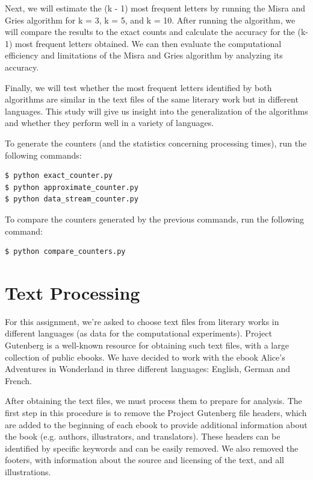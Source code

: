 \documentclass[]{revdetua}
\begin{document}
Next, we will estimate the (k - 1) most frequent letters by running the Misra and Gries algorithm for k = 3, k = 5, and k = 10. After running the algorithm, we will compare the results to the exact counts and calculate the accuracy for the (k-1) most frequent letters obtained. We can then evaluate the computational efficiency and limitations of the Misra and Gries algorithm by analyzing its accuracy.

Finally, we will test whether the most frequent letters identified by both algorithms are similar in the text files of the same literary work but in different languages. This study will give us insight into the generalization of the algorithms and whether they perform well in a variety of languages.

To generate the counters (and the statistics concerning processing times), run the following commands:

\begin{verbatim}
$ python exact_counter.py 
$ python approximate_counter.py
$ python data_stream_counter.py
\end{verbatim}

To compare the counters generated by the previous commands, run the following command:

\begin{verbatim}
$ python compare_counters.py
\end{verbatim}

\section{Text Processing}

For this assignment, we're asked to choose text files from literary works in different languages (as data for the computational experiments). Project Gutenberg is a well-known resource for obtaining such text files, with a large collection of public ebooks. We have decided to work with the ebook Alice’s Adventures in Wonderland in three different languages: English, German and French.

After obtaining the text files, we must process them to prepare for analysis. The first step in this procedure is to remove the Project Gutenberg file headers, which are added to the beginning of each ebook to provide additional information about the book (e.g. authors, illustrators, and translators). These headers can be identified by specific keywords and can be easily removed. We also removed the footers, with information about the source and licensing of the text, and all illustrations.
\end{document}
